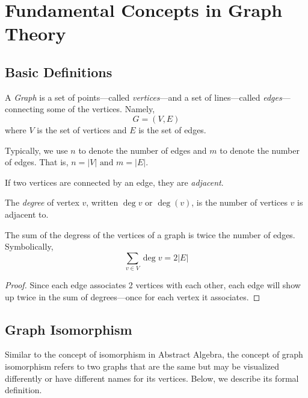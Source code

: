 \chapter{Fundamental Concepts in Graph Theory}

\section{Basic Definitions}

\begin{definition}[Graph]
  A \textit{Graph} is a set of points---called \textit{vertices}---and a set of lines---called \textit{edges}---connecting some of the vertices. Namely, 
  \begin{displaymath}
    G = (V, E)
  \end{displaymath}
  where \(V\) is the set of vertices and \(E\) is the set of edges.

  Typically, we use \(n\) to denote the number of edges and \(m\) to denote the number of edges. That is, \(n = |V| \text{ and } m = |E|\).
\end{definition}

\begin{definition}[Adjacency]
  If two vertices are connected by an edge, they are \textit{adjacent}. 
\end{definition}

\begin{definition}[Degree]
  The \textit{degree} of vertex \(v\), written \(\deg{v}\) or \(\deg(v)\), is
  the number of vertices \(v\) is adjacent to. 
\end{definition}

\begin{lemma}
  The sum of the degress of the vertices of a graph is twice the number of edges. Symbolically,
  \[ \sum_{v \in V} \deg{v} = 2|E| \]
\end{lemma}

\begin{proof}
  Since each edge associates 2 vertices with each other, each edge will show up twice in the sum of degrees---once for each vertex it associates.
\end{proof}

\section{Graph Isomorphism}

Similar to the concept of isomorphism in Abstract Algebra, the concept of graph
isomorphism refers to two graphs that are the same but may be visualized 
differently or have different names for its vertices. Below, we describe its 
formal definition.

